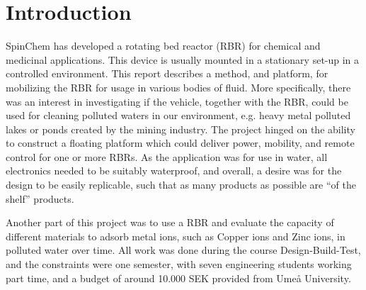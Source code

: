 \section{Introduction}

SpinChem\textsuperscript{\textregistered} has developed a rotating bed reactor (RBR) for chemical and medicinal
applications. This device is usually mounted in a stationary set-up in a
controlled environment. This report describes a method, and platform, for
mobilizing the RBR for usage in various bodies of fluid. More specifically,
there was an interest in investigating if the vehicle, together with the RBR,
could be used for cleaning polluted waters in our environment, e.g. heavy metal
polluted lakes or ponds created by the mining industry. The project hinged on
the ability to construct a floating platform which could deliver power,
mobility, and remote control for one or more RBRs. As the application was for
use in water, all electronics needed to be suitably waterproof, and overall, a
desire was for the design to be easily replicable, such that as many products as
possible are ``of the shelf'' products.

Another part of this project was to use a RBR and evaluate the capacity of
different materials to adsorb metal ions, such as Copper ions and Zinc ions, in
polluted water over time. All work was done during the course Design-Build-Test,
and the constraints were one semester, with seven engineering students working
part time, and a budget of around 10.000 SEK provided from Umeå University.

